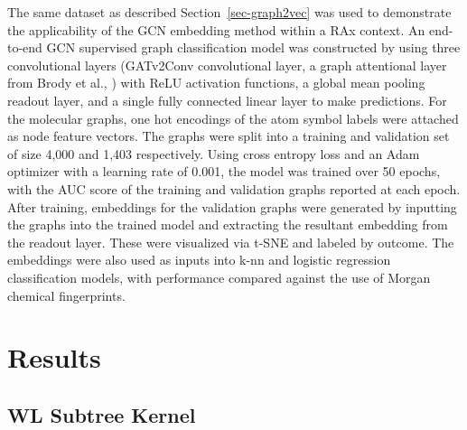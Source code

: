 \documentclass[
  super,
  preprint,
  3p]{elsarticle}
\begin{document}
The same dataset as described Section~\ref{sec-graph2vec} was used to
demonstrate the applicability of the GCN embedding method within a RAx
context. An end-to-end GCN supervised graph classification model was
constructed by using three convolutional layers (GATv2Conv convolutional
layer, a graph attentional layer from Brody et al., \citep{RN56}) with
ReLU activation functions, a global mean pooling readout layer, and a
single fully connected linear layer to make predictions. For the
molecular graphs, one hot encodings of the atom symbol labels were
attached as node feature vectors. The graphs were split into a training
and validation set of size 4,000 and 1,403 respectively. Using cross
entropy loss and an Adam optimizer with a learning rate of 0.001, the
model was trained over 50 epochs, with the AUC score of the training and
validation graphs reported at each epoch. After training, embeddings for
the validation graphs were generated by inputting the graphs into the
trained model and extracting the resultant embedding from the readout
layer. These were visualized via t-SNE and labeled by outcome. The
embeddings were also used as inputs into k-nn and logistic regression
classification models, with performance compared against the use of
Morgan chemical fingerprints.

\section{Results}\label{results}

\subsection{WL Subtree Kernel}\label{wl-subtree-kernel}
\end{document}
